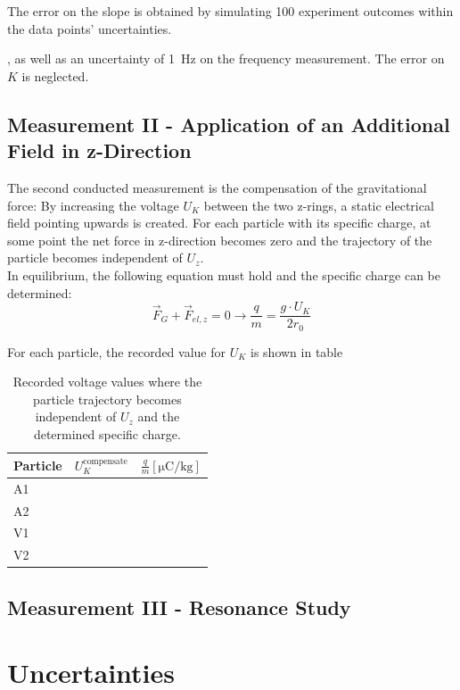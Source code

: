 \documentclass[
	paper=A4,
	parskip=full,
	chapterprefix=true,
	11pt,
	headings=normal,
	bibliography=totoc,
	listof=totoc,
	titlepage=on,
]{scrreprt}
\begin{document}
The error on the slope is obtained by simulating \num{100} experiment outcomes within the data points' uncertainties.




, as well as an uncertainty of \SI{1}{\hertz} on the frequency measurement. The error on $K$ is neglected.


\section{Measurement II - Application of an Additional Field in z-Direction}
The second conducted measurement is the compensation of the gravitational force: By increasing the voltage $U_K$ between the two z-rings, a static electrical field pointing upwards is created. For each particle with its specific charge, at some point the net force in z-direction becomes zero and the trajectory of the particle becomes independent of $U_z$. \\
In equilibrium, the following equation must hold and the specific charge can be determined:
\begin{equation}
\vec{F}_G+\vec{F}_{el,z} = 0 \rightarrow \frac{q}{m} = \frac{g\cdot U_K}{2r_0}
\end{equation}

For each particle, the recorded value for $U_K$ is shown in table

\begin{table}[htbp]
	\centering
	\begin{tabular}{
			l
			l
			l
		}
		\toprule
		Particle & $U_K^{\textrm{compensate}}$ & $\frac{q}{m} [\si{\micro\coulomb\per\kilogram}]$  \\ 
		\midrule
		A1 & \\
		A2 & \\
		V1 & \\
		V2 & \\
		
		\bottomrule
	\end{tabular}
	\caption{Recorded voltage values where the particle trajectory becomes independent of $U_z$ and the determined specific charge.}
	\label{tbl:Gcomp}
\end{table}


\section{Measurement III - Resonance Study}

\chapter{Uncertainties}
\label{ch:systematics}
\end{document}
